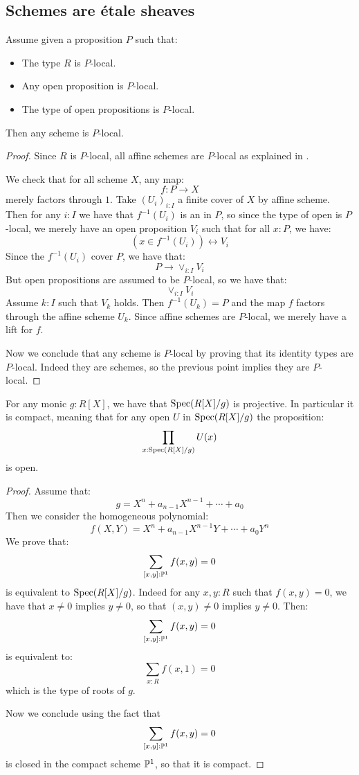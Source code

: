 \subsection{Schemes are \'etale sheaves}

\begin{lemma}\label{scheme-are-sheaf-from-affine}
Assume given a proposition $P$ such that:
\begin{itemize}
\item The type $R$ is $P$-local.
\item Any open proposition is $P$-local.
\item The type of open propositions is $P$-local.
\end{itemize}
Then any scheme is $P$-local.
\end{lemma}

\begin{proof}
Since $R$ is $P$-local, all affine schemes are $P$-local as explained in .

We check that for all scheme $X$, any map:
\[f:P\to X\]
merely factors through $1$. Take $(U_i)_{i:I}$ a finite cover of $X$ by affine scheme. Then for any $i:I$ we have that $f^{-1}(U_i)$ is an in $P$, so since the type of open is $P$-local, we merely have an open proposition $V_i$ such that for all $x:P$, we have:
\[(x\in f^{-1}(U_i) )\leftrightarrow V_i\]
Since the $f^{-1}(U_i)$ cover $P$, we have that:
\[P\to \lor_{i:I} V_i\]
But open propositions are assumed to be $P$-local, so we have that:
\[ \lor_{i:I} V_i\]
Assume $k:I$ such that $V_k$ holds. Then $f^{-1}(U_k) = P$ and the map $f$ factors through the affine scheme $U_k$. Since affine schemes are $P$-local, we merely have a lift for $f$.

Now we conclude that any scheme is $P$-local by proving that its identity types are $P$-local. Indeed they are schemes, so the previous point implies they are $P$-local.
\end{proof}


\begin{lemma}\label{roots-monic-proper}
For any monic $g:R[X]$, we have that $\operatorname{Spec}(R[X]/g)$ is projective. In particular it is compact, meaning that for any open $U$ in $\operatorname{Spec}(R[X]/g)$ the proposition:
\[\prod_{x:\operatorname{Spec}(R[X]/g)}U(x)\]
is open.
\end{lemma}

\begin{proof}
Assume that:
\[g=X^n+a_{n-1}X^{n-1}+\cdots+a_0\]
Then we consider the homogeneous polynomial:
\[f(X,Y) = X^n + a_{n-1}X^{n-1}Y+\cdots+a_0Y^n\]
We prove that:
\[\sum_{[x,y]:\mathbb{P}^1}f(x,y) = 0\]
is equivalent to $\operatorname{Spec}(R[X]/g)$. Indeed for any $x,y:R$ such that $f(x,y)=0$, we have that $x\not=0$ implies $y\not=0$, so that $(x,y)\not=0$ implies $y\not=0$. Then:
\[\sum_{[x,y]:\mathbb{P}^1}f(x,y) = 0\]
is equivalent to:
\[\sum_{x:R} f(x,1)=0\]
which is the type of roots of $g$. 

Now we conclude using the fact that 
\[\sum_{[x,y]:\mathbb{P}^1}f(x,y) = 0\]
is closed in the compact scheme $\mathbb{P}^1$, so that it is compact.
\end{proof}

